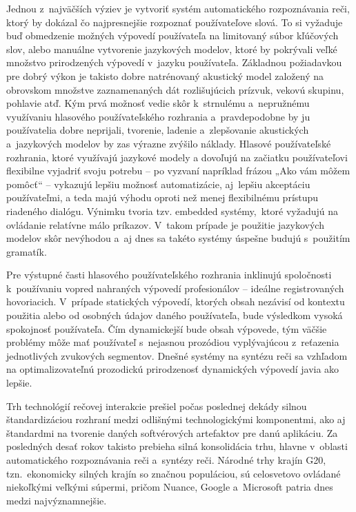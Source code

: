 Jednou z~najväčších výziev je vytvoriť systém automatického
rozpoznávania reči, ktorý by dokázal čo najpresnejšie rozpoznať
používateľove slová. To si vyžaduje buď obmedzenie možných
výpovedí používateľa na limitovaný súbor kľúčových slov,
alebo manuálne vytvorenie jazykových modelov, ktoré by pokrývali
veľké množstvo prirodzených výpovedí v~jazyku používateľa.
Základnou požiadavkou pre dobrý výkon je takisto dobre natrénovaný
akustický model založený na obrovskom množstve zaznamenaných dát
rozlišujúcich prízvuk, vekovú skupinu, pohlavie atď. Kým prvá
možnosť vedie skôr k~strnulému a~nepružnému využívaniu
hlasového používateľského rozhrania a~pravdepodobne by ju
používatelia dobre neprijali, tvorenie, ladenie a~zlepšovanie
akustických a~jazykových modelov by zas výrazne zvýšilo náklady.
Hlasové používateľské rozhrania, ktoré využívajú jazykové
modely a dovoľujú na začiatku používateľovi flexibilne vyjadriť
svoju potrebu -- po vyzvaní napríklad frázou „Ako vám môžem
pomôcť“ -- vykazujú lepšiu možnosť automatizácie,
aj~lepšiu akceptáciu používateľmi, a teda majú výhodu oproti
než menej flexibilnému prístupu riadeného dialógu. Výnimku tvoria
tzv. embedded systémy,~ktoré vyžadujú na ovládanie relatívne málo
príkazov. V~takom prípade je použitie jazykových modelov
skôr nevýhodou a~aj dnes sa takéto systémy úspešne budujú
s~použitím gramatík.

Pre výstupné časti hlasového používateľského rozhrania inklinujú spoločnosti k~používaniu vopred nahraných výpovedí profesionálov – ideálne registrovaných hovoriacich. V~prípade statických výpovedí, ktorých obsah nezávisí od kontextu použitia alebo od osobných údajov daného používateľa, bude výsledkom vysoká spokojnosť používateľa. Čím dynamickejší bude obsah výpovede, tým väčšie problémy môže mať používateľ s~nejasnou prozódiou vyplývajúcou z~reťazenia jednotlivých zvukových segmentov. Dnešné systémy na syntézu reči sa vzhľadom na optimalizovateľnú prozodickú prirodzenosť dynamických výpovedí javia ako lepšie. 

Trh technológií rečovej interakcie prešiel počas poslednej dekády silnou štandardizáciou rozhraní medzi odlišnými technologickými komponentmi, ako aj štandardmi na tvorenie daných softvérových artefaktov pre danú aplikáciu. Za posledných desať rokov takisto prebieha silná konsolidácia trhu, hlavne v~oblasti automatického rozpoznávania reči a~syntézy reči. Národné trhy krajín G20, tzn.~ekonomicky silných krajín so značnou populáciou, sú celosvetovo ovládané niekoľkými veľkými súpermi, pričom Nuance, Google a~Microsoft patria dnes medzi najvýznamnejšie.

